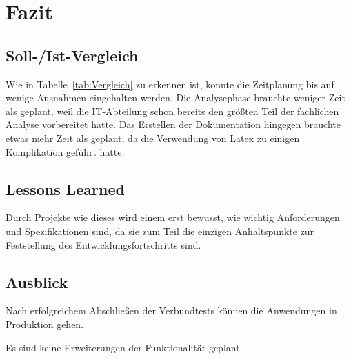 \section{Fazit} 
\label{sec:Fazit}

\subsection{Soll-/Ist-Vergleich}
\label{sec:SollIstVergleich}

Wie in Tabelle~\ref{tab:Vergleich} zu erkennen ist, konnte die Zeitplanung bis auf wenige Ausnahmen eingehalten werden. Die Analysephase brauchte weniger Zeit als geplant, weil die IT-Abteilung schon bereits den größten Teil der fachlichen Analyse vorbereitet hatte. Das Erstellen der Dokumentation hingegen brauchte etwas mehr Zeit als geplant, da die Verwendung von Latex zu einigen Komplikation geführt hatte.


\subsection{Lessons Learned}
\label{sec:LessonsLearned}

Durch Projekte wie dieses wird einem erst bewusst, wie wichtig Anforderungen und Spezifikationen sind, da sie zum Teil die einzigen Anhaltspunkte zur Feststellung des Entwicklungsfortschritts sind.

\subsection{Ausblick}
\label{sec:Ausblick}

Nach erfolgreichem Abschließen der Verbundtests können die Anwendungen in Produktion gehen.

Es sind keine Erweiterungen der Funktionalität geplant.
